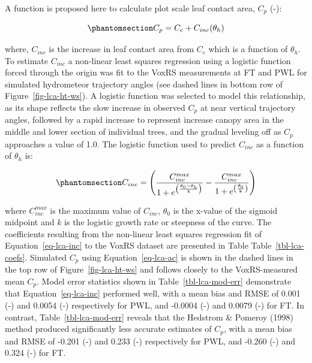 \documentclass[
  letterpaper,
  DIV=11,
  numbers=noendperiod]{scrartcl}
\begin{document}
A function is proposed here to calculate plot scale leaf contact area,
\(C_p\) (-):

\begin{equation}\phantomsection\label{eq-lca-ac}{
C_p = C_c + C_{inc}(\theta_h)
}\end{equation}

where, \(C_{inc}\) is the increase in leaf contact area from \(C_c\)
which is a function of \(\theta_h\). To estimate \(C_{inc}\) a
non-linear least squares regression using a logistic function forced
through the origin was fit to the VoxRS measurements at FT and PWL for
simulated hydrometeor trajectory angles (see dashed lines in bottom row
of Figure~\ref{fig-lca-ht-ws}). A logistic function was selected to
model this relationship, as its shape reflects the slow increase in
observed \(C_p\) at near vertical trajectory angles, followed by a rapid
increase to represent increase canopy area in the middle and lower
section of individual trees, and the gradual leveling off as \(C_p\)
approaches a value of 1.0. The logistic function used to predict
\(C_{inc}\) as a function of \(\theta_h\) is:

\begin{equation}\phantomsection\label{eq-lca-inc}{
C_{inc} = \left(
\frac{C^{max}_{inc}}{1 + e ^ {\left(\frac{\theta_0 - \theta_h}{\text{k}}\right)}} - \frac{C^{max}_{inc}}{1 + e ^ {\left(\frac{\theta_0}{\text{k}}\right)}}
\right)
}\end{equation}

where \(C^{max}_{inc}\) is the maximum value of \(C_{inc}\),
\(\theta_0\) is the x-value of the sigmoid midpoint and \(k\) is the
logistic growth rate or steepness of the curve. The coefficients
resulting from the non-linear least squares regression fit of
Equation~\ref{eq-lca-inc} to the VoxRS dataset are presented in Table
Table~\ref{tbl-lca-coefs}. Simulated \(C_p\) using
Equation~\ref{eq-lca-ac} is shown in the dashed lines in the top row of
Figure~\ref{fig-lca-ht-ws} and follows closely to the VoxRS-measured
mean \(C_p\). Model error statistics shown in
Table~\ref{tbl-lca-mod-err} demonstrate that Equation~\ref{eq-lca-inc}
performed well, with a mean bias and RMSE of 0.001 (-) and 0.0054 (-)
respectively for PWL, and -0.0004 (-) and 0.0079 (-) for FT. In
contrast, Table~\ref{tbl-lca-mod-err} reveals that the Hedstrom \&
Pomeroy (1998) method produced significantly less accurate estimates of
\(C_p\), with a mean bias and RMSE of -0.201 (-) and 0.233 (-)
respectively for PWL, and -0.260 (-) and 0.324 (-) for FT.
\end{document}
